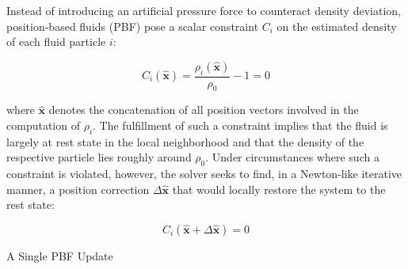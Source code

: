 \documentclass[
	11pt, 
	DIV10,
	ngerman,
	a4paper, 
	oneside, 
	headings=normal, 
	captions=tableheading,
	final, 
	numbers=noenddot
]{scrartcl}
\begin{document}
Instead of introducing an artificial pressure force to counteract density deviation, position-based fluids (PBF) pose a scalar constraint $ C_{i} $ on the estimated density of each fluid particle $ i $:

\begin{equation}
	\label{eq20}
	C_{i}(\hat{\boldsymbol{x}}) = \frac{\rho_{i}(\hat{\boldsymbol{x}})}{\rho_{0}} - 1 = 0
\end{equation}

where $ \hat{\boldsymbol{x}} $ denotes the concatenation of all position vectors involved in the computation of $ \rho_{i} $. The fulfillment of such a constraint implies that the fluid is largely at rest state in the local neighborhood and that the density of the respective particle lies roughly around $ \rho_{0} $. Under circumstances where such a constraint is violated, however, the solver seeks to find, in a Newton-like iterative manner, a position correction $ \Delta \hat{\boldsymbol{x}} $ that would locally restore the system to the rest state:

\begin{equation}
	\label{eq21}
	C_{i}(\hat{\boldsymbol{x}} + \Delta \hat{\boldsymbol{x}}) = 0
\end{equation}

\medskip
\begin{algorithm}[H]
	\DontPrintSemicolon
	\SetAlgoLined
	\caption{\label{alg3} A Single PBF Update}
\end{algorithm}
\medskip
\end{document}
